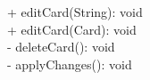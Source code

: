 { 
    + editCard(String): void\\
    + editCard(Card): void\\
    - deleteCard(): void\\
    - applyChanges(): void \\
}{}